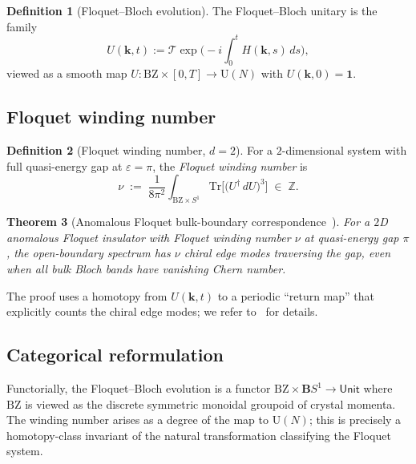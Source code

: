 \documentclass[12pt]{article}
\newtheorem{theorem}{Theorem}[section]
\theoremstyle{definition}
\newtheorem{definition}[theorem]{Definition}
\theoremstyle{remark}
\newcommand{\Z}{\mathbb{Z}}
\newcommand{\one}{\mathbf{1}}
\begin{document}
\begin{definition}[Floquet--Bloch evolution]
\label{def:floquet-bloch}
The Floquet--Bloch unitary is the family
\begin{equation*}
U(\mathbf{k},t):=\mathcal{T}\exp\biggl(-i\!\int_0^t H(\mathbf{k},s)\,ds\biggr),
\end{equation*}
viewed as a smooth map $U\colon\mathrm{BZ}\times[0,T]\to\mathrm{U}(N)$ with $U(\mathbf{k},0)=\one$.
\end{definition}

\subsection{Floquet winding number}

\begin{definition}[Floquet winding number, $d=2$]
\label{def:winding}
For a $2$-dimensional system with full quasi-energy gap at $\varepsilon=\pi$, the \emph{Floquet winding number} is
\begin{equation}
\nu \;:=\; \frac{1}{8\pi^2}\int_{\mathrm{BZ}\times S^1}\!\!\mathrm{Tr}\bigl[\bigl(U^\dagger\,dU\bigr)^3\bigr]\;\in\;\Z.
\end{equation}
\end{definition}

\begin{theorem}[Anomalous Floquet bulk-boundary correspondence~\cite{rudner2020}]
\label{thm:rudner-lindner}
For a $2$D anomalous Floquet insulator with Floquet winding number $\nu$ at quasi-energy gap $\pi$, the open-boundary spectrum has $\nu$ chiral edge modes traversing the gap, even when all bulk Bloch bands have vanishing Chern number.
\end{theorem}

The proof uses a homotopy from $U(\mathbf{k},t)$ to a periodic ``return map'' that explicitly counts the chiral edge modes; we refer to~\cite{rudner2020} for details.

\subsection{Categorical reformulation}

Functorially, the Floquet--Bloch evolution is a functor $\mathrm{BZ}\times \mathbf{B}S^1\to\mathsf{Unit}$ where $\mathrm{BZ}$ is viewed as the discrete symmetric monoidal groupoid of crystal momenta. The winding number arises as a degree of the map to $\mathrm{U}(N)$; this is precisely a homotopy-class invariant of the natural transformation classifying the Floquet system.
\end{document}
